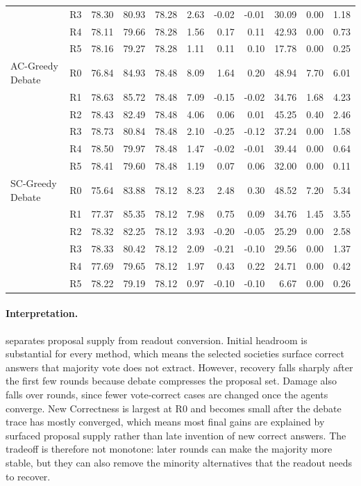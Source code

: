 \begin{table}[t]
{\begin{tabular}{llrrrrrrrrr}
 & R3 & 78.30 & 80.93 & 78.28 & 2.63 & -0.02 & -0.01 & 30.09 & 0.00 & 1.18 \\
 & R4 & 78.11 & 79.66 & 78.28 & 1.56 & 0.17 & 0.11 & 42.93 & 0.00 & 0.73 \\
 & R5 & 78.16 & 79.27 & 78.28 & 1.11 & 0.11 & 0.10 & 17.78 & 0.00 & 0.25 \\
\midrule
AC-Greedy Debate & R0 & 76.84 & 84.93 & 78.48 & 8.09 & 1.64 & 0.20 & 48.94 & 7.70 & 6.01 \\
 & R1 & 78.63 & 85.72 & 78.48 & 7.09 & -0.15 & -0.02 & 34.76 & 1.68 & 4.23 \\
 & R2 & 78.43 & 82.49 & 78.48 & 4.06 & 0.06 & 0.01 & 45.25 & 0.40 & 2.46 \\
 & R3 & 78.73 & 80.84 & 78.48 & 2.10 & -0.25 & -0.12 & 37.24 & 0.00 & 1.58 \\
 & R4 & 78.50 & 79.97 & 78.48 & 1.47 & -0.02 & -0.01 & 39.44 & 0.00 & 0.64 \\
 & R5 & 78.41 & 79.60 & 78.48 & 1.19 & 0.07 & 0.06 & 32.00 & 0.00 & 0.11 \\
\midrule
SC-Greedy Debate & R0 & 75.64 & 83.88 & 78.12 & 8.23 & 2.48 & 0.30 & 48.52 & 7.20 & 5.34 \\
 & R1 & 77.37 & 85.35 & 78.12 & 7.98 & 0.75 & 0.09 & 34.76 & 1.45 & 3.55 \\
 & R2 & 78.32 & 82.25 & 78.12 & 3.93 & -0.20 & -0.05 & 25.29 & 0.00 & 2.58 \\
 & R3 & 78.33 & 80.42 & 78.12 & 2.09 & -0.21 & -0.10 & 29.56 & 0.00 & 1.37 \\
 & R4 & 77.69 & 79.65 & 78.12 & 1.97 & 0.43 & 0.22 & 24.71 & 0.00 & 0.42 \\
 & R5 & 78.22 & 79.19 & 78.12 & 0.97 & -0.10 & -0.10 & 6.67 & 0.00 & 0.26 \\
\bottomrule
\end{tabular}
}
\label{tab:round_recovery_diagnostics}
\end{table}

\paragraph{Interpretation.}
 separates proposal supply from readout
conversion. Initial headroom is substantial for every method, which means the
selected societies surface correct answers that majority vote does not extract.
However, recovery falls sharply after the first few rounds because debate
compresses the proposal set. Damage also falls over rounds, since fewer
vote-correct cases are changed once the agents converge. New Correctness is
largest at R0 and becomes small after the debate trace has mostly converged,
which means most final gains are explained by surfaced proposal supply rather
than late invention of new correct answers. The tradeoff is
therefore not monotone: later rounds can make the majority more stable, but
they can also remove the minority alternatives that the readout needs to
recover.

